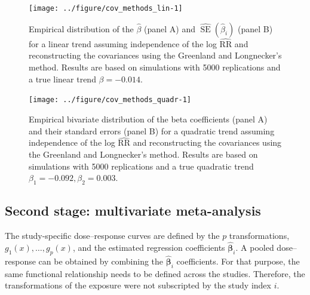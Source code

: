 \documentclass[11pt,a4paper,twoside,openany]{book}\usepackage{knitr}
\DeclareMathOperator{\SE}{SE}
\begin{document}
{{\begin{knitrout}\footnotesize
{}\color{fgcolor}\begin{figure}[ht!]

{\centering \texttt{[image: ../figure/cov\_methods\_lin-1]} 

}

\caption[Empirical distribution of the $\hat \beta$ (panel A) and $\widehat{\SE} \left( \hat \beta_i \right)$ (panel B) for a linear trend assuming independence of the log $\widehat{\mathrm{RR}}$  and reconstructing the covariances using the Greenland and Longnecker’s method]{Empirical distribution of the $\hat \beta$ (panel A) and $\widehat{\SE} \left( \hat \beta_i \right)$ (panel B) for a linear trend assuming independence of the log $\widehat{\mathrm{RR}}$  and reconstructing the covariances using the Greenland and Longnecker’s method. Results are based on simulations with 5000 replications and a true linear trend $\beta = -0.014$.}\label{fig:cov_methods_lin}
\end{figure}


\end{knitrout}

\begin{knitrout}\footnotesize
{}\color{fgcolor}\begin{figure}[ht!]

{\centering \texttt{[image: ../figure/cov\_methods\_quadr-1]} 

}

\caption{Empirical bivariate distribution of the beta coefficients (panel A) and their standard errors (panel B) for a quadratic trend assuming independence of the log $\widehat{\mathrm{RR}}$  and reconstructing the covariances using the Greenland and Longnecker’s method. Results are based on simulations with 5000 replications and a true quadratic trend $\beta_{1} = -0.092, \beta_{2} = 0.003$.}\label{fig:cov_methods_quadr}
\end{figure}


\end{knitrout}


\subsection{Second stage: multivariate meta-analysis}\label{sec:2nd_stage}

The study-specific dose--response curves are defined by the $p$ transformations, $g_1(x), \dots, g_p(x)$, and the estimated regression coefficients $\boldsymbol{\hat \beta}_i$. A pooled dose--response can be obtained by combining the $\boldsymbol{\hat \beta}_i$ coefficients. For that purpose, the same functional relationship needs to be defined across the studies. Therefore, the transformations of the exposure were not subscripted by the study index $i$.

}}
\end{document}
